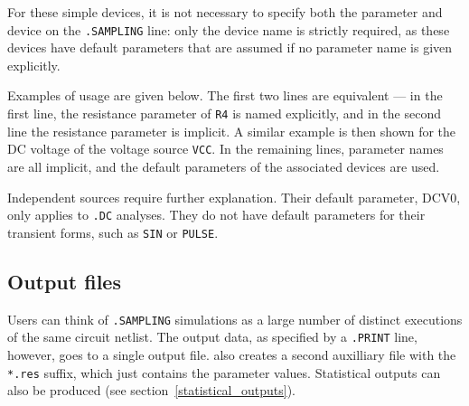 For these simple devices, it is not necessary to specify both the
parameter and device on the \texttt{.SAMPLING} line: only the device name
is strictly required, as these devices have default
parameters that are assumed if no parameter name is given explicitly.

Examples of usage are given below.  The first two lines are equivalent
--- in the first line, the resistance parameter of \texttt{R4} is
named explicitly, and in the second line the resistance parameter is
implicit. A similar example is then shown for the DC voltage of the 
voltage source \texttt{VCC}.  In the remaining lines, parameter names are all 
implicit, and the default parameters of the associated devices are used.


Independent sources require further explanation.  Their default
parameter, DCV0, only applies to \texttt{.DC} analyses.  They do not have
default parameters for their transient forms, such as \texttt{SIN}
or \texttt{PULSE}.

\subsection{Output files}
\label{sampling_output_files}

Users can think of \texttt{.SAMPLING} simulations as a large number of distinct executions
of the same circuit netlist.  The output data, as specified by a \texttt{.PRINT}
line, however, goes to a single output file.  
\Xyce{} also creates a second auxilliary file with the \texttt{*.res} 
suffix, which just contains the parameter values.  Statistical outputs 
can also be produced (see section~\ref{statistical_outputs}).

